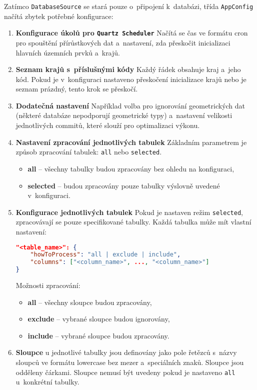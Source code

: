 Zatímco \texttt{DatabaseSource} se stará pouze o~připojení k~databázi,  
třída \texttt{AppConfig} načítá zbytek potřebné konfigurace:
\begin{enumerate}
    \item \textbf{Konfigurace úkolů pro \texttt{Quartz Scheduler}}  
    Načítá se čas ve formátu cron pro spouštění přírůstkových dat  
    a~nastavení, zda přeskočit inicializaci hlavních územních prvků a~krajů.
    \item \textbf{Seznam krajů s~příslušnými kódy}  
    Každý řádek obsahuje kraj a~jeho kód.  
    Pokud je v~konfiguraci nastaveno přeskočení inicializace krajů nebo je seznam prázdný, tento krok se přeskočí.
    \item \textbf{Dodatečná nastavení}  
    Například volba pro ignorování geometrických dat  
    (některé databáze nepodporují geometrické typy)  
    a~nastavení velikosti jednotlivých commitů, které slouží pro optimalizaci výkonu.
    \item \textbf{Nastavení zpracování jednotlivých tabulek}  
    Základním parametrem je způsob zpracování tabulek: \texttt{all} nebo \texttt{selected}.  
    \begin{itemize}
        \item \textbf{all} -- všechny tabulky budou zpracovány bez ohledu na konfiguraci,
        \item \textbf{selected} -- budou zpracovány pouze tabulky výslovně uvedené v~konfiguraci.
    \end{itemize}
    \item \textbf{Konfigurace jednotlivých tabulek}  
    Pokud je nastaven režim \texttt{selected}, zpracovávají se pouze specifikované tabulky.  
    Každá tabulka může mít vlastní nastavení:
    \begin{lstlisting}[language=json, caption={Konfigurace tabulek}, label=lst:konfTabulek]
"<table_name>": {
    "howToProcess": "all | exclude | include",
    "columns": ["<column_name>", ..., "<column_name>"]
}
    \end{lstlisting}
    
    Možnosti zpracování:
    \begin{itemize}
        \item \textbf{all} -- všechny sloupce budou zpracovány,
        \item \textbf{exclude} -- vybrané sloupce budou ignorovány,
        \item \textbf{include} -- vybrané sloupce budou zpracovány.
    \end{itemize}

    \item \textbf{Sloupce} u jednotlivé tabulky jsou definovány jako pole řetězců s~názvy sloupců 
    ve formátu lowercase bez mezer a~speciálních znaků. Sloupce jsou odděleny čárkami.
    Sloupce nemusí být uvedeny pokud je nastaveno \texttt{all} u~konkrétní tabulky.
\end{enumerate}

